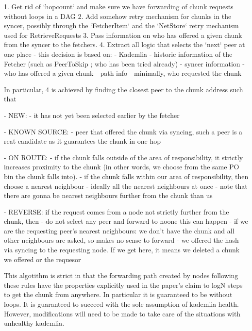 




1. Get rid of `hopcount` and make sure we have forwarding of chunk requests without loops in a DAG
2. Add somehow retry mechanism for chunks in the syncer, possibly through the `FetcherItem` and the `NetStore` retry mechanism used for RetrieveRequests
3. Pass information on who has offered a given chunk from the syncer to the fetchers.
4. Extract all logic that selects the `next` peer at one place - this decision is based on:
    - Kademlia
    - historic information of the Fetcher (such as PeerToSkip ; who has been tried already)
    - syncer information - who has offered a given chunk
    - path info - minimally, who requested the chunk

In particular, 4 is achieved by finding the closest peer to the chunk address such that
    
    
- NEW: 
    - it has not yet been selected earlier by the fetcher
    
- KNOWN SOURCE:
    - peer that offered the chunk via syncing, such a peer is a reat candidate as it guarantees the chunk in one hop
    
- ON ROUTE: 
    - if the chunk falls outside of the area of responsibility, it strictly increases proximity to the chunk (in other words, we choose from the same PO bin the chunk falls into). 
    - if the chunk falls within our area of responsibility, then choose a nearest neighbour - ideally all the nearest neighbours at once - note that there are gonna be nearest neighbours further from the chunk than us

- REVERSE: if the request comes from a node not strictly further from the chunk, then
  - do not select any peer and forward to noone
      this can happen 
      - if we are the requesting peer's nearest neighbours:
        we don't have the chunk and all other neighbours are asked, so makes no sense to forward
      - we offered the hash via syncing to the requesting node. If we get here, it means we deleted a chunk we offered or the  requesor 
      
      This algotithm is strict in that the forwarding path created by nodes following these rules have the properties explicitly used in the paper's claim to logN steps to get the chunk from anywhere. 
      In particular it is guaranteed to be without loops. It is guaranteed to succeed with the sole assumption of kademlia health. However, modifications will need to be made to take care of the situations with unhealthy kademlia.